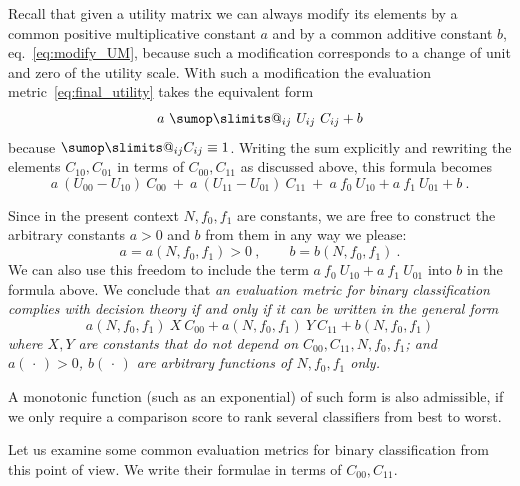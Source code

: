\documentclass[\ifafour a4paper,12pt,\else a5paper,10pt,\fi%
onecolumn,oneside,article,%
british%
]{memoir}
\makeatletter
\theoremstyle{remark}
\theoremstyle{innote}
\def\sum{\DOTSI\sumop\slimits@}
\newcommand*{\dotv}{\mathord{\,\cdot\,}}%
\renewcommand*{\|}[1][]{\nonscript\:#1\vert\nonscript\:\mathopen{}}
\newcommand*{\eqn}{eq.}%
\newcommand*{\cx}{X}
\newcommand*{\cy}{Y}
\makeatother
\begin{document}
Recall that given a utility matrix we can always modify its elements by a common positive multiplicative constant $a$ and by a common additive constant $b$, \eqn~\eqref{eq:modify_UM}, because such a modification corresponds to a change of unit and zero of the utility scale. With such a modification the evaluation metric~\eqref{eq:final_utility} takes the equivalent form
\begin{equation}
  \label{eq:final_utility_modified}
 a\ \sum_{ij} \ U_{ij}\ C_{ij} + b
\end{equation}
because $\sum_{ij} C_{ij} \equiv 1$. Writing the sum explicitly and rewriting the elements $C_{10}, C_{01}$ in terms of $C_{00}, C_{11}$ as discussed above, this formula becomes 
\begin{equation}
  \label{eq:final_utility_binary}
    a\ (U_{00} - U_{10})\ C_{00} \ + \ 
    a\ (U_{11} - U_{01})\ C_{11} \ + \ 
    a\ f_{0}\ U_{10} + a\ f_{1}\ U_{01} +  b \ .
\end{equation}

Since in the present context $N, f_{0}, f_{1}$ are constants, we are free to construct the arbitrary constants $a > 0$ and $b$ from them in any way we please:
\begin{equation}
  \label{eq:constants_functions}
  a = a(N, f_{0}, f_{1}) > 0\ , \qquad
  b = b(N, f_{0}, f_{1}) \ .
\end{equation}
We can also use this freedom to include the term $a\ f_{0}\ U_{10} + a\ f_{1}\ U_{01}$ into $b$ in the formula above. We conclude that \emph{an evaluation metric for binary classification complies with decision theory if and only if it can be written in the general form}
\begin{equation}
  \label{eq:general_valuation_metric}
  a(N, f_{0}, f_{1})\ \cx\ C_{00} +
  a(N, f_{0}, f_{1})\ \cy\  C_{11} +
  b(N, f_{0}, f_{1})
\end{equation}
\emph{where $\cx,\cy$ are constants that do not depend on $C_{00}, C_{11}, N, f_{0}, f_{1}$; and $a(\dotv)>0$, $b(\dotv)$ are arbitrary functions of $N, f_{0}, f_{1}$ only.}

A monotonic function (such as an exponential) of such form is also admissible, if we only require a comparison score to rank several classifiers from best to worst.

Let us examine some common evaluation metrics for binary classification from this point of view. We write their formulae in terms of $C_{00}, C_{11}$.
\end{document}

